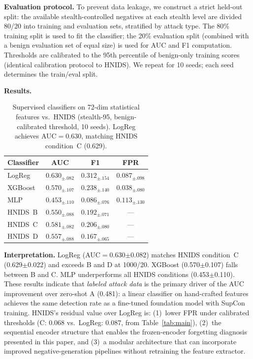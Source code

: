\textbf{Evaluation protocol.}
To prevent data leakage, we construct a strict held-out split: the available
stealth-controlled negatives at each stealth level are divided 80/20 into
training and evaluation sets, stratified by attack type.
The 80\% training split is used to fit the classifier; the 20\% evaluation
split (combined with a benign evaluation set of equal size) is used for
AUC and F1 computation.
Thresholds are calibrated to the 95th percentile of benign-only training
scores (identical calibration protocol to HNIDS).
We repeat for 10 seeds; each seed determines the train/eval split.

\textbf{Results.}

\begin{table}[h]
\centering
\small
\caption{
  Supervised classifiers on 72-dim statistical features vs.\ HNIDS
  (stealth-95, benign-calibrated threshold, 10 seeds).
  LogReg achieves AUC$=$0.630, matching HNIDS condition~C (0.629).
}
\label{tab:supervised_baselines}
\begin{tabular}{lccc}
\toprule
Classifier & AUC & F1 & FPR \\
\midrule
LogReg         & $0.630_{\pm.082}$ & $0.312_{\pm.154}$ & $0.087_{\pm.098}$ \\
XGBoost        & $0.570_{\pm.107}$ & $0.238_{\pm.140}$ & $0.038_{\pm.080}$ \\
MLP            & $0.453_{\pm.110}$ & $0.086_{\pm.076}$ & $0.113_{\pm.130}$ \\
\midrule
HNIDS~B        & $0.550_{\pm.088}$ & $0.192_{\pm.071}$ & --- \\
HNIDS~C        & $0.581_{\pm.082}$ & $0.206_{\pm.080}$ & --- \\
HNIDS~D        & $0.557_{\pm.088}$ & $0.167_{\pm.065}$ & --- \\
\bottomrule
\end{tabular}
\end{table}

\textbf{Interpretation.}
LogReg (AUC$=$0.630$\pm$0.082) matches HNIDS condition~C (0.629$\pm$0.022)
and exceeds B and D at 1000/20.
XGBoost (0.570$\pm$0.107) falls between B and C.
MLP underperforms all HNIDS conditions (0.453$\pm$0.110).
These results indicate that \emph{labeled attack data} is the primary driver
of the AUC improvement over zero-shot A (0.481): a linear classifier on
hand-crafted features achieves the same detection rate as a fine-tuned
foundation model with SupCon training.
HNIDS's residual value over LogReg is: (1)~lower FPR under calibrated
thresholds (C: 0.068 vs.\ LogReg: 0.087, from Table~\ref{tab:main}),
(2)~the sequential encoder structure that enables the frozen-encoder
forgetting diagnosis presented in this paper, and (3)~a modular architecture
that can incorporate improved negative-generation pipelines without retraining
the feature extractor.
